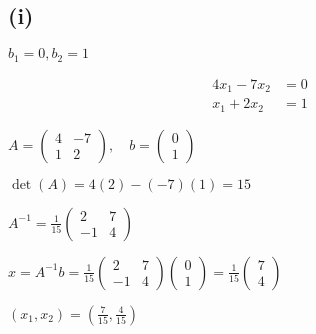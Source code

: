 \subsection*{(i)} $b_1 = 0, b_2 = 1$

\begin{align}
	4x_1 - 7x_2 & = 0 \\
	x_1 + 2x_2  & = 1
\end{align}

$A = \begin{pmatrix}
	4 & -7 \\
	1 & 2
\end{pmatrix}, \quad b = \begin{pmatrix}
	0 \\
	1
\end{pmatrix}$

$\det(A) = 4(2) - (-7)(1) = 15$

$A^{-1} = \frac{1}{15}\begin{pmatrix}
	2 & 7 \\
	-1 & 4
\end{pmatrix}$

$x = A^{-1}b = \frac{1}{15}\begin{pmatrix}
	2 & 7 \\
	-1 & 4
\end{pmatrix}\begin{pmatrix}
	0 \\
	1
\end{pmatrix} = \frac{1}{15}\begin{pmatrix}
	7 \\
	4
\end{pmatrix}$

$\boxed{(x_1, x_2) = \left(\frac{7}{15}, \frac{4}{15}\right)}$
